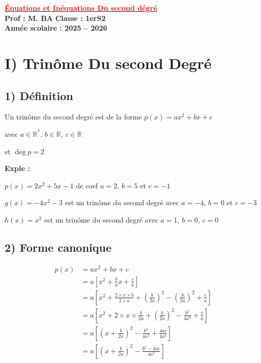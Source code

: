 \documentclass[12pt,a4paper]{article}
\begin{document}
\begin{center}
    \Large\textbf{\underline{\textcolor{red}{Équations et Inéquations Du second dégré}}}\\[-0.1cm]
    \normalsize\textbf{Prof : M. BA} \hfill \textbf{Classe : 1erS2}\\[-0.1cm]
    \textbf{Année scolaire : 2025 -- 2026}
\end{center}
\vspace{1em}
\section*{\color{myred} I) Trinôme Du second Degré}

\subsection*{\color{myred} 1) Définition}
Un trinôme du second degré est de la forme $p(x) = ax^2 + bx + c$ 

avec $a \in \mathbb{R}^*$, $b \in \mathbb{R}$, $c \in \mathbb{R}$ 

et $\deg p = 2$

\noindent\textbf{Exple :}

$p(x) = 2x^2 + 5x - 1$ de coef $a = 2$, $b = 5$ et $c = -1$

$g(x) = -4x^2 - 3$ est un trinôme du second degré avec $a = -4$, $b = 0$ et $c = -3$

$h(x) = x^2$ est un trinôme du second degré avec $a = 1$, $b = 0$, $c = 0$

\subsection*{\color{myred} 2) Forme canonique}

\begin{equation*}
\begin{aligned}
p(x) &= ax^2 + bx + c\\
&= a \left[ x^2 + \frac{b}{a}x + \frac{c}{a} \right] \\
&= a \left[ x^2 + \frac{2 \times x \times b}{2 \times a} + \left(\frac{b}{2a}\right)^2 - \left(\frac{b}{2a}\right)^2 + \frac{c}{a} \right] \\
&= a \left[ x^2 + 2 \times x \times \frac{b}{2a} + \left(\frac{b}{2a}\right)^2 - \frac{b^2}{4a^2} + \frac{c}{a} \right] \\
&= a \left[ \left(x + \frac{b}{2a}\right)^2 - \frac{b^2}{4a^2} + \frac{4ac}{4a^2} \right] \\
&= a \left[ \left(x + \frac{b}{2a}\right)^2 - \frac{b^2 - 4ac}{4a^2} \right]
\end{aligned}
\end{equation*}
\end{document}
